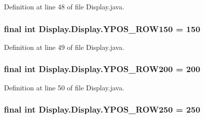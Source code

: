 Definition at line 48 of file Display.\+java.

\hypertarget{class_display_1_1_display_a38a83d9cebcb54826379194267a2ab4a}{}
\subsubsection[{Y\+P\+O\+S\+\_\+\+R\+O\+W150}]{\setlength{\rightskip}{0pt plus 5cm}final int Display.\+Display.\+Y\+P\+O\+S\+\_\+\+R\+O\+W150 = 150\hspace{0.3cm}{\ttfamily [static]}}\label{class_display_1_1_display_a38a83d9cebcb54826379194267a2ab4a}


Definition at line 49 of file Display.\+java.

\hypertarget{class_display_1_1_display_af186989bbcc82bddc811ce9727cb1d4d}{}
\subsubsection[{Y\+P\+O\+S\+\_\+\+R\+O\+W200}]{\setlength{\rightskip}{0pt plus 5cm}final int Display.\+Display.\+Y\+P\+O\+S\+\_\+\+R\+O\+W200 = 200\hspace{0.3cm}{\ttfamily [static]}}\label{class_display_1_1_display_af186989bbcc82bddc811ce9727cb1d4d}


Definition at line 50 of file Display.\+java.

\hypertarget{class_display_1_1_display_a76fe305a0d851cc121da69952ee13b00}{}
\subsubsection[{Y\+P\+O\+S\+\_\+\+R\+O\+W250}]{\setlength{\rightskip}{0pt plus 5cm}final int Display.\+Display.\+Y\+P\+O\+S\+\_\+\+R\+O\+W250 = 250\hspace{0.3cm}{\ttfamily [static]}}\label{class_display_1_1_display_a76fe305a0d851cc121da69952ee13b00}


